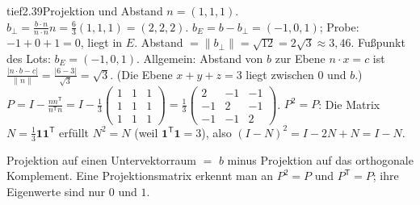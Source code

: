 \begin{loesungkarte}{tief}{2.39}{Projektion und Abstand}
$n = (1, 1, 1)$. $b_\perp = \frac{b\cdot n}{n\cdot n}n = \frac63(1, 1, 1) = (2, 2, 2)$. $b_E = b - b_\perp = (-1, 0, 1)$; Probe: $-1 + 0 + 1 = 0$, liegt in $E$. \checkmark
{}
Abstand $= \|b_\perp\| = \sqrt{12} = 2\sqrt3\approx3{,}46$. Fußpunkt des Lots: $b_E = (-1, 0, 1)$.
Allgemein: Abstand von $b$ zur Ebene $n\cdot x = c$ ist $\frac{|n\cdot b - c|}{\|n\|} = \frac{|6 - 3|}{\sqrt3} = \sqrt3$. (Die Ebene $x + y + z = 3$ liegt zwischen $0$ und $b$.)
$P = I - \frac{nn^{\mathsf T}}{n^{\mathsf T}n} = I - \frac13\begin{pmatrix}1 & 1 & 1\\ 1 & 1 & 1\\ 1 & 1 & 1\end{pmatrix} = \frac13\begin{pmatrix}2 & -1 & -1\\ -1 & 2 & -1\\ -1 & -1 & 2\end{pmatrix}$. $P^{2} = P$: Die Matrix $N = \frac13\mathbf 1\mathbf 1^{\mathsf T}$ erfüllt $N^{2} = N$ (weil $\mathbf 1^{\mathsf T}\mathbf 1 = 3$), also $(I - N)^{2} = I - 2N + N = I - N$. \checkmark
{}
\begin{mitnehmen}\kastentext
Projektion auf einen Untervektorraum $=$ $b$ minus Projektion auf das orthogonale Komplement. Eine Projektionsmatrix erkennt man an $P^{2} = P$ und $P^{\mathsf T} = P$; ihre Eigenwerte sind nur $0$ und $1$.
\end{mitnehmen}
\end{loesungkarte}

